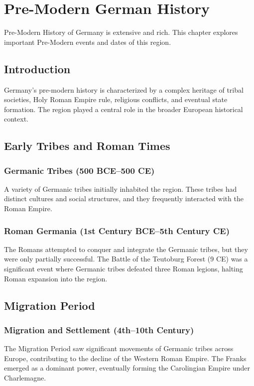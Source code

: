 \documentclass[a4paper,12pt]{book}
\begin{document}
\chapter{Pre-Modern German History}
\label{ch:pre-modern-german-history}

Pre-Modern History of Germany is extensive and rich. This chapter explores important Pre-Modern events and dates of this region.

\section{Introduction}
\label{sec:introduction-pre-modern-germany}
Germany’s pre-modern history is characterized by a complex heritage of tribal societies, Holy Roman Empire rule, religious conflicts, and eventual state formation. The region played a central role in the broader European historical context.

\section{Early Tribes and Roman Times}
\label{sec:early-tribes-roman-times}
\subsection{Germanic Tribes (500 BCE–500 CE)}
A variety of Germanic tribes initially inhabited the region. These tribes had distinct cultures and social structures, and they frequently interacted with the Roman Empire.

\subsection{Roman Germania (1st Century BCE–5th Century CE)}
The Romans attempted to conquer and integrate the Germanic tribes, but they were only partially successful. The Battle of the Teutoburg Forest (9 CE) was a significant event where Germanic tribes defeated three Roman legions, halting Roman expansion into the region.

\section{Migration Period}
\label{sec:migration-period}
\subsection{Migration and Settlement (4th–10th Century)}
The Migration Period saw significant movements of Germanic tribes across Europe, contributing to the decline of the Western Roman Empire. The Franks emerged as a dominant power, eventually forming the Carolingian Empire under Charlemagne.
\end{document}
